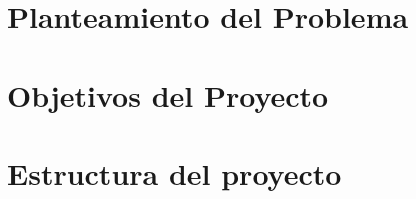 \section{Planteamiento del Problema}

\section{Objetivos del Proyecto}

\section{Estructura del proyecto}

\newpage

